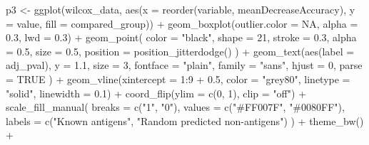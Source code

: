 \documentclass[
  11pt,
  oneside]{book}
\newenvironment{Shaded}{\begin{snugshade}}{\end{snugshade}}
\newcommand{\AttributeTok}[1]{\textcolor[rgb]{0.77,0.63,0.00}{#1}}
\newcommand{\ConstantTok}[1]{\textcolor[rgb]{0.00,0.00,0.00}{#1}}
\newcommand{\DecValTok}[1]{\textcolor[rgb]{0.00,0.00,0.81}{#1}}
\newcommand{\FloatTok}[1]{\textcolor[rgb]{0.00,0.00,0.81}{#1}}
\newcommand{\FunctionTok}[1]{\textcolor[rgb]{0.00,0.00,0.00}{#1}}
\newcommand{\NormalTok}[1]{#1}
\newcommand{\OtherTok}[1]{\textcolor[rgb]{0.56,0.35,0.01}{#1}}
\newcommand{\SpecialCharTok}[1]{\textcolor[rgb]{0.00,0.00,0.00}{#1}}
\newcommand{\StringTok}[1]{\textcolor[rgb]{0.31,0.60,0.02}{#1}}
\begin{document}
\begin{Shaded}
\begin{Highlighting}[]
\NormalTok{p3 }\OtherTok{\textless{}{-}} \FunctionTok{ggplot}\NormalTok{(wilcox\_data, }\FunctionTok{aes}\NormalTok{(}\AttributeTok{x =} \FunctionTok{reorder}\NormalTok{(variable, meanDecreaseAccuracy), }\AttributeTok{y =}\NormalTok{ value, }\AttributeTok{fill =}\NormalTok{ compared\_group)) }\SpecialCharTok{+}
  \FunctionTok{geom\_boxplot}\NormalTok{(}\AttributeTok{outlier.color =} \ConstantTok{NA}\NormalTok{, }\AttributeTok{alpha =} \FloatTok{0.3}\NormalTok{, }\AttributeTok{lwd =} \FloatTok{0.3}\NormalTok{) }\SpecialCharTok{+}
  \FunctionTok{geom\_point}\NormalTok{(}
    \AttributeTok{color =} \StringTok{"black"}\NormalTok{, }\AttributeTok{shape =} \DecValTok{21}\NormalTok{, }\AttributeTok{stroke =} \FloatTok{0.3}\NormalTok{, }\AttributeTok{alpha =} \FloatTok{0.5}\NormalTok{, }\AttributeTok{size =} \FloatTok{0.5}\NormalTok{,}
    \AttributeTok{position =} \FunctionTok{position\_jitterdodge}\NormalTok{()}
\NormalTok{  ) }\SpecialCharTok{+}
  \FunctionTok{geom\_text}\NormalTok{(}\FunctionTok{aes}\NormalTok{(}\AttributeTok{label =}\NormalTok{ adj\_pval),}
    \AttributeTok{y =} \FloatTok{1.1}\NormalTok{, }\AttributeTok{size =} \DecValTok{3}\NormalTok{, }\AttributeTok{fontface =} \StringTok{"plain"}\NormalTok{, }\AttributeTok{family =} \StringTok{"sans"}\NormalTok{,}
    \AttributeTok{hjust =} \DecValTok{0}\NormalTok{, }\AttributeTok{parse =} \ConstantTok{TRUE}
\NormalTok{  ) }\SpecialCharTok{+}
  \FunctionTok{geom\_vline}\NormalTok{(}\AttributeTok{xintercept =} \DecValTok{1}\SpecialCharTok{:}\DecValTok{9} \SpecialCharTok{+} \FloatTok{0.5}\NormalTok{, }\AttributeTok{color =} \StringTok{"grey80"}\NormalTok{, }\AttributeTok{linetype =} \StringTok{"solid"}\NormalTok{, }\AttributeTok{linewidth =} \FloatTok{0.1}\NormalTok{) }\SpecialCharTok{+}
  \FunctionTok{coord\_flip}\NormalTok{(}\AttributeTok{ylim =} \FunctionTok{c}\NormalTok{(}\DecValTok{0}\NormalTok{, }\DecValTok{1}\NormalTok{), }\AttributeTok{clip =} \StringTok{"off"}\NormalTok{) }\SpecialCharTok{+}
  \FunctionTok{scale\_fill\_manual}\NormalTok{(}
    \AttributeTok{breaks =} \FunctionTok{c}\NormalTok{(}\StringTok{"1"}\NormalTok{, }\StringTok{"0"}\NormalTok{), }\AttributeTok{values =} \FunctionTok{c}\NormalTok{(}\StringTok{"\#FF007F"}\NormalTok{, }\StringTok{"\#0080FF"}\NormalTok{),}
    \AttributeTok{labels =} \FunctionTok{c}\NormalTok{(}\StringTok{"Known antigens"}\NormalTok{, }\StringTok{"Random predicted non{-}antigens"}\NormalTok{)}
\NormalTok{  ) }\SpecialCharTok{+}
  \FunctionTok{theme\_bw}\NormalTok{() }\SpecialCharTok{+}

\end{Highlighting}
\end{Shaded}
\end{document}
